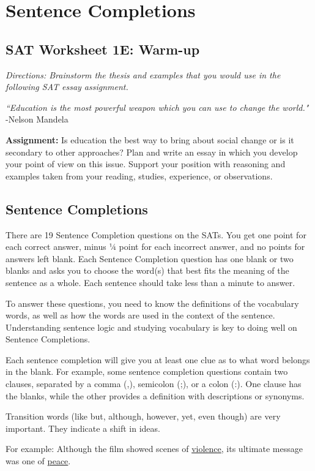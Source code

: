 \chapter{Sentence Completions}
\section{SAT Worksheet 1E: Warm-up}
\textit{Directions: Brainstorm the thesis and examples that you would use in the following SAT essay assignment.}

\textit{``Education is the most powerful weapon which you can use to change the world."}
-Nelson Mandela

\bigskip
\textbf{Assignment:} Is education the best way to bring about social change or is it secondary to other approaches?  Plan and write an essay in which you develop your point of view on this issue.  Support your position with reasoning and examples taken from your reading, studies, experience, or observations.

\vfill
\newpage

\section{Sentence Completions}
There are 19 Sentence Completion questions on the SATs.  You get one point for each correct answer, minus ¼ point for each incorrect answer, and no points for answers left blank. Each Sentence Completion question has one blank or two blanks and asks you to choose the word(s) that best fits the meaning of the sentence as a whole.  Each sentence should take less than a minute to answer.

\bigskip
To answer these questions, you need to know the definitions of the vocabulary words, as well as how the words are used in the context of the sentence.  Understanding sentence logic and studying vocabulary is key to doing well on Sentence Completions.  

\bigskip
Each sentence completion will give you at least one clue as to what word belongs in the blank. For example, some sentence completion questions contain two clauses, separated by a comma (,), semicolon (;), or a colon (:).  One clause has the blanks, while the other provides a definition with descriptions or synonyms.

\bigskip
Transition words (like but, although, however, yet, even though) are very important.  They indicate a shift in ideas.  

\bigskip
For example:  Although the film showed scenes of \underline{violence}, its ultimate message was one of \underline{peace}.  

